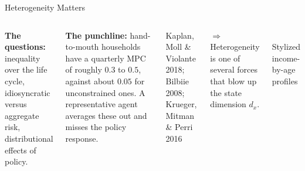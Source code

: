 \documentclass[aspectratio=169,11pt]{beamer}
\newcommand{\emphc}[1]{\textcolor{harvardcrimson}{#1}}
\begin{document}
\begin{frame}{Heterogeneity Matters}
\begin{columns}[T]
\textbf{The questions:} inequality over the life cycle, idiosyncratic versus aggregate risk, distributional effects of policy.

\vspace{0.4em}
\textbf{The punchline:} \emphc{hand-to-mouth} households have a quarterly MPC of roughly $0.3$ to $0.5$, against about $0.05$ for unconstrained ones. A representative agent averages these out and misses the policy response.

\vspace{0.3em}
{\footnotesize Kaplan, Moll \& Violante 2018; Bilbiie 2008; Krueger, Mitman \& Perri 2016}

\vspace{0.4em}
$\Rightarrow$ Heterogeneity is one of several forces that \emphc{blow up} the state dimension $d_x$.

\begin{center}
\\
{\footnotesize Stylized income-by-age profiles}
\end{center}
\end{columns}
\end{frame}
\end{document}

